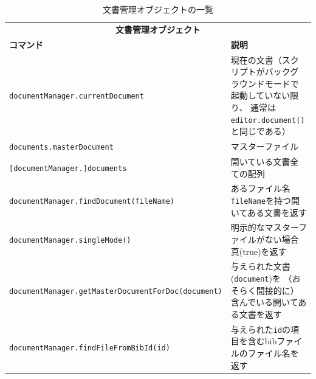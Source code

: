 \begin{table}[H]
  \centering
  \caption{文書管理オブジェクトの一覧}
  \begin{tabularx}{\linewidth}{lX}
    \hline
    \multicolumn{2}{c}{\textbf{文書管理オブジェクト}}\\
    \textbf{コマンド} & \textbf{説明}\\
    \hline
    \texttt{documentManager.currentDocument}
      & 現在の文書（スクリプトがバックグラウンドモードで起動していない限り、
      通常は\texttt{editor.document()}と同じである）\\
    \texttt{documents.masterDocument} & マスターファイル\\
    \texttt{{[}documentManager.{]}documents} & 開いている文書全ての配列\\
    \texttt{documentManager.findDocument(fileName)}
      & あるファイル名\texttt{fileName}を持つ開いてある文書を返す\\
    \texttt{documentManager.singleMode()}
      & 明示的なマスターファイルがない場合真(true)を返す\\
    \texttt{documentManager.getMasterDocumentForDoc(document)}
      & 与えられた文書(\texttt{document})を
      （おそらく間接的に）含んでいる開いてある文書を返す\\
    \texttt{documentManager.findFileFromBibId(id)}
      & 与えられた\texttt{id}の項目を含むbibファイルのファイル名を返す\\
    \hline
  \end{tabularx}
\end{table}



